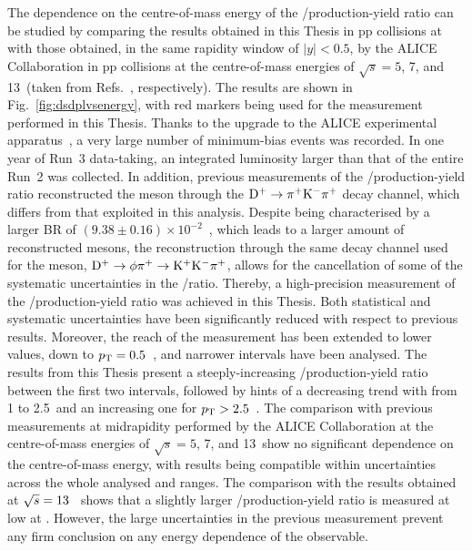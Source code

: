 The dependence on the centre-of-mass energy of the \ds/\dpl production-yield ratio can be studied by comparing the results obtained in this Thesis in pp collisions at \thirteen with those obtained, in the same rapidity window of \mbox{$\lvert y\rvert<0.5$}, by the ALICE Collaboration in pp collisions at the centre-of-mass energies of $\sqrt{s} = 5$, 7, and 13~\tev (taken from Refs.~\cite{ALICE:2021mgk,ALICE:2017olh,ALICE:2023sgl}, respectively). The results are shown in Fig.~\ref{fig:dsdplvsenergy}, with red markers being used for the measurement performed in this Thesis. Thanks to the upgrade to the ALICE experimental apparatus~\cite{ALICE:2023udb}, a very large number of minimum-bias events was recorded. In one year of Run~3 data-taking, an integrated luminosity larger than that of the entire Run~2 was collected. In addition, previous measurements of the \ds/\dpl production-yield ratio reconstructed the \dpl meson through the $\mathrm{D^+}\rightarrow\pi^+\mathrm{K}^-\pi^+$ decay channel, which differs from that exploited in this analysis. Despite being characterised by a larger BR of \mbox{$(9.38\pm0.16)\times10^{-2}$}~\cite{pdg}, which leads to a larger amount of reconstructed \dpl mesons, the reconstruction through the same decay channel used for the \ds meson, $\mathrm{D^+} \rightarrow \mathrm{\phi\pi^+ \rightarrow K^+K^-\pi^+}$, allows for the cancellation of some of the systematic uncertainties in the \ds/\dpl ratio. Thereby, a high-precision measurement of the \ds/\dpl production-yield ratio was achieved in this Thesis. Both statistical and systematic uncertainties have been significantly reduced with respect to previous results. Moreover, the \pt reach of the measurement has been extended to lower values, down to $p_\mathrm{T}=0.5$~\gevc, and narrower \pt intervals have been analysed. The results from this Thesis present a steeply-increasing \ds/\dpl production-yield ratio between the first two \pt intervals, followed by hints of a decreasing trend with \pt from 1 to 2.5~\gevc and an increasing one for $p_\mathrm{T}>2.5$~\gevc. The comparison with previous measurements at midrapidity performed by the ALICE Collaboration at the centre-of-mass energies of $\sqrt{s} = 5$, 7, and 13~\tev show no significant dependence on the centre-of-mass energy, with results being compatible within uncertainties across the whole analysed \pt and \sqs ranges. The comparison with the results obtained at \mbox{$\sqrt{s}=13$~\tev} shows that a slightly larger \ds/\dpl production-yield ratio is measured at low \pt at \mbox{\thirteen}. However, the large uncertainties in the previous measurement prevent any firm conclusion on any energy dependence of the observable.


